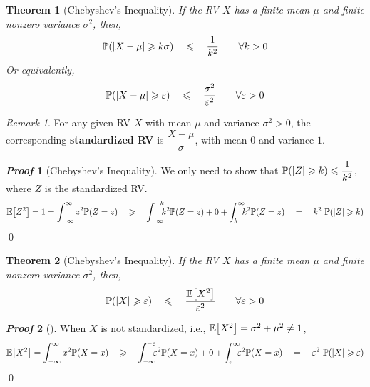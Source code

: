 \documentclass[10pt,UTF8]{article}
\newenvironment{definition box}
{\begin{tcolorbox}[colback=blue!5!white,colframe=blue!75!black,parbox=false,before upper=\par,before lower=\par]}
{\end{tcolorbox}}
\newenvironment{theorem box}
{\begin{tcolorbox}[colback=yellow!5!white,colframe=yellow!75!black,parbox=false,before upper=\par,before lower=\par]}
{\end{tcolorbox}}
\theoremstyle{definition}
\newtheorem{definition inner}{Definition}[section]
\theoremstyle{plain}
\newtheorem{theorem inner}{Theorem}[section]
\newenvironment{theorem}[1][]
{\begin{theorem box}\begin{theorem inner}[#1]\hfill\par}
{\end{theorem inner}\end{theorem box}}
\theoremstyle{definition}
\newtheorem*{proof inner}{\textit{Proof}}
\renewenvironment{proof}[1][]
{\begin{proof inner}[#1]\hfill\par}
{\qed\end{proof inner}}
\theoremstyle{remark}
\newtheorem*{remark}{\textit{Remark}}
\newcommand{\E}[1]{\mathbb{E}\qty[#1]}  %
\newcommand{\Prob}{\mathbb{P}\qty}
\begin{document}
\begin{theorem}[Chebyshev's Inequality]
    If the RV $X$ has a finite mean $\mu$ and finite nonzero variance $\sigma^2$,
    then,
    \begin{equation*}
        \Prob(\abs{X - \mu} \geqslant k\sigma) \quad\leqslant\quad \frac{1}{k^2}
        \qquad \forall k>0
    \end{equation*}
    Or equivalently,
    \begin{equation*}
        \Prob(\abs{X - \mu} \geqslant \varepsilon) \quad\leqslant\quad
        \frac{\sigma^2}{\varepsilon^2}
        \qquad \forall \varepsilon > 0
    \end{equation*}
\end{theorem}
\begin{remark}
    For any given RV $X$ with mean $\mu$ and variance $\sigma^2>0$,
    the corresponding \textbf{standardized RV} is $\dfrac{X-\mu}{\sigma}$,
    with mean $0$ and variance $1$.
\end{remark}
\begin{proof}[Chebyshev's Inequality]
    We only need to show that $\Prob(\abs{Z} \geqslant k) \leqslant \dfrac{1}{k^2}$,
    where $Z$ is the standardized RV.
    \begin{align*}
        \E{Z^2} = 1 = \int_{-\infty}^{\infty} z^2 \Prob(Z=z)
        \quad\geqslant\quad
        \int_{-\infty}^{-k}\!\!\!k^2 \Prob(Z=z) + 0
        + \int_{k}^{\infty}\!\!\!k^2 \Prob(Z=z)
        \quad=\quad k^2\ \Prob(\abs{Z} \geqslant k)
    \end{align*}
\end{proof}

\begin{theorem}[Chebyshev's Inequality]
    If the RV $X$ has a finite mean $\mu$ and finite nonzero variance $\sigma^2$,
    then,
    \begin{equation*}
        \Prob(\abs{X} \geqslant \varepsilon) \quad\leqslant\quad
        \frac{\E{X^2}}{\varepsilon^2}
        \qquad \forall \varepsilon > 0
    \end{equation*}
\end{theorem}
\begin{proof}
    When $X$ is not standardized, i.e., $\E{X^2}=\sigma^2+\mu^2\neq 1$,
    \begin{align*}
        \E{X^2} = \int_{-\infty}^{\infty} x^2 \Prob(X=x)
        \quad\geqslant\quad
        \int_{-\infty}^{-\varepsilon}\!\!\!\varepsilon^2 \Prob(X=x) + 0
        + \int_{\varepsilon}^{\infty}\!\!\!\varepsilon^2 \Prob(X=x)
        \quad=\quad \varepsilon^2\ \Prob(\abs{X} \geqslant \varepsilon)
    \end{align*}
\end{proof}
\end{document}
